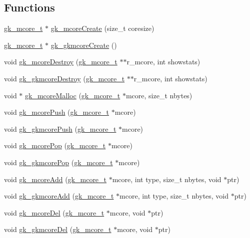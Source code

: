 \subsection*{Functions}
\begin{DoxyCompactItemize}
\item 
\hyperlink{a00682}{gk\+\_\+mcore\+\_\+t} $\ast$ \hyperlink{a00107_aba5df0f5155d88c0331fd6c996b483ed}{gk\+\_\+mcore\+Create} (size\+\_\+t coresize)
\item 
\hyperlink{a00682}{gk\+\_\+mcore\+\_\+t} $\ast$ \hyperlink{a00107_afe0ba6f8d611bfebcbe80468c86af884}{gk\+\_\+gkmcore\+Create} ()
\item 
void \hyperlink{a00107_acecd8b70b01b2b365695f034967c9536}{gk\+\_\+mcore\+Destroy} (\hyperlink{a00682}{gk\+\_\+mcore\+\_\+t} $\ast$$\ast$r\+\_\+mcore, int showstats)
\item 
void \hyperlink{a00107_af01302d6237a06da732bba561ed53538}{gk\+\_\+gkmcore\+Destroy} (\hyperlink{a00682}{gk\+\_\+mcore\+\_\+t} $\ast$$\ast$r\+\_\+mcore, int showstats)
\item 
void $\ast$ \hyperlink{a00107_ab7a380f0696a0d5421653fad336bcae0}{gk\+\_\+mcore\+Malloc} (\hyperlink{a00682}{gk\+\_\+mcore\+\_\+t} $\ast$mcore, size\+\_\+t nbytes)
\item 
void \hyperlink{a00107_a07579694837248c1f2908860edc643c0}{gk\+\_\+mcore\+Push} (\hyperlink{a00682}{gk\+\_\+mcore\+\_\+t} $\ast$mcore)
\item 
void \hyperlink{a00107_a7e52f5d61f36e5c6a9e6634d90dadf2d}{gk\+\_\+gkmcore\+Push} (\hyperlink{a00682}{gk\+\_\+mcore\+\_\+t} $\ast$mcore)
\item 
void \hyperlink{a00107_ac7b3189a2be11b6736dc4c27d3d30f3a}{gk\+\_\+mcore\+Pop} (\hyperlink{a00682}{gk\+\_\+mcore\+\_\+t} $\ast$mcore)
\item 
void \hyperlink{a00107_ad8c9738b8a6a34af2aa8f271fe14cfa9}{gk\+\_\+gkmcore\+Pop} (\hyperlink{a00682}{gk\+\_\+mcore\+\_\+t} $\ast$mcore)
\item 
void \hyperlink{a00107_a366348b623d380f773e5946011e14059}{gk\+\_\+mcore\+Add} (\hyperlink{a00682}{gk\+\_\+mcore\+\_\+t} $\ast$mcore, int type, size\+\_\+t nbytes, void $\ast$ptr)
\item 
void \hyperlink{a00107_a3777d3929aad6ae5e17b76656cd6797b}{gk\+\_\+gkmcore\+Add} (\hyperlink{a00682}{gk\+\_\+mcore\+\_\+t} $\ast$mcore, int type, size\+\_\+t nbytes, void $\ast$ptr)
\item 
void \hyperlink{a00107_a0e63861ea56a62080a63408af43a9075}{gk\+\_\+mcore\+Del} (\hyperlink{a00682}{gk\+\_\+mcore\+\_\+t} $\ast$mcore, void $\ast$ptr)
\item 
void \hyperlink{a00107_a6b0166aa10e35fb252f8561cac8f3bbb}{gk\+\_\+gkmcore\+Del} (\hyperlink{a00682}{gk\+\_\+mcore\+\_\+t} $\ast$mcore, void $\ast$ptr)
\end{DoxyCompactItemize}


